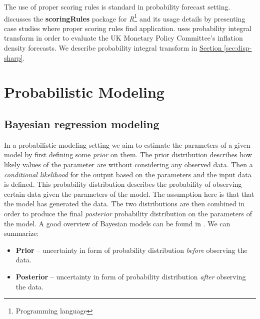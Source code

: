 \documentclass[12pt,a4paper,twoside]{scrartcl}
\numberwithin{equation}{section}
\newcommand{\refsec}[1]{\hyperref[#1]{Section \ref*{#1}}}
\begin{document}
The use of proper scoring rules is standard in probability forecast setting. \cite{jordan2017} discusses the \textbf{scoringRules} package for \emph{R}\footnote{Programming language} and its usage details by presenting case studies where proper scoring rules find application. \cite{clements2004} uses probability integral transform in order to evaluate the UK Monetary Policy Committee's inflation density forecasts. We describe probability integral transform in \refsec{sec:disp-sharp}.
\section{Probabilistic Modeling}\label{sec:prob-modeling}
\subsection{Bayesian regression modeling}\label{sec:bayesian-inference}
In a probabilistic modeling setting we aim to estimate the parameters of a given model by first defining some \emph{prior} on them. The prior distribution describes how likely values of the parameter are without considering any observed data. Then a \emph{conditional likelihood} for the output based on the parameters and the input data is defined. This probability distribution describes the probability of observing certain data given the parameters of the model. The assumption here is that that the model has generated the data. The two distributions are then combined in order to produce the final \emph{posterior} probability distribution on the parameters of the model. A good overview of Bayesian models can be found in \cite{mitchell97}. We can summarize:
\begin{itemize}
\item \textbf{Prior} -- uncertainty in form of probability distribution \emph{before} observing the data.
\item \textbf{Posterior} -- uncertainty in form of probability distribution \emph{after} observing the data.
\end{itemize}
\end{document}
